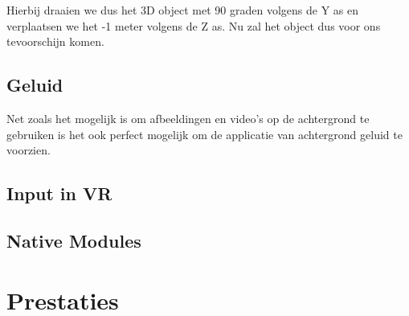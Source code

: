 Hierbij draaien we dus het 3D object met 90 graden volgens de Y as en verplaatsen we het -1 meter volgens de Z as. Nu zal het object dus voor ons tevoorschijn komen.

\subsection{Geluid}
\label{subsec:Geluid}
Net zoals het mogelijk is om afbeeldingen en video's op de achtergrond te gebruiken is het ook perfect mogelijk om de applicatie van achtergrond geluid te voorzien. 


\subsection{Input in VR}
\label{subsec:input-vr}


\subsection{Native Modules}

\section{Prestaties}
\label{sec:prestaties}